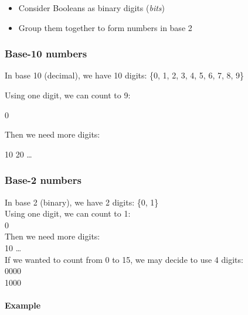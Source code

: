 \documentclass[12pt]{article}
\begin{document}
\begin{itemize}
    \item Consider Booleans as binary digits (\textit{bits})
    \item Group them together to form numbers in base 2
\end{itemize}

\subsubsection{Base-10 numbers}

In base 10 (decimal), we have 10 digits: \{0, 1, 2, 3, 4, 5, 6, 7, 8, 9\}

Using one digit, we can count to 9:

\begin{center}
    0         
\end{center}

Then we need more digits:

\begin{center}
    10         
    20    \quad \ldots
\end{center}

\subsubsection{Base-2 numbers}

In base 2 (binary), we have 2 digits: \{0, 1\}\\
Using one digit, we can count to 1: \\
0 \\

Then we need more digits: \\
10        \ldots\\
If we wanted to count from 0 to 15, we may decide to use 4 digits:\\
0000       \\
1000       \\

\paragraph{Example}
\end{document}
